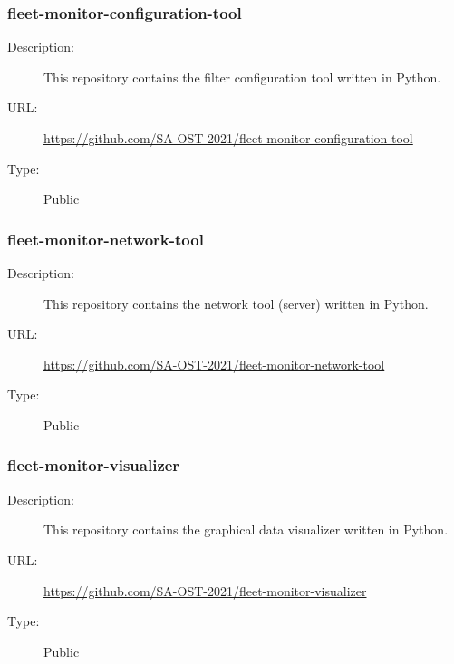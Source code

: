 \subsubsection{fleet-monitor-configuration-tool} \vspace{-0.2cm}
\begin{description}
  \item[Description:] This repository contains the filter configuration tool written in Python.\vspace{-0.25cm}
  \item[URL:] \url{https://github.com/SA-OST-2021/fleet-monitor-configuration-tool}\vspace{-0.25cm}
  \item[Type:] Public\vspace{-0.25cm}
\end{description}

\subsubsection{fleet-monitor-network-tool} \vspace{-0.2cm}
\begin{description}
  \item[Description:] This repository contains the network tool (server) written in Python.\vspace{-0.25cm}
  \item[URL:] \url{https://github.com/SA-OST-2021/fleet-monitor-network-tool}\vspace{-0.25cm}
  \item[Type:] Public\vspace{-0.25cm}
\end{description}

\subsubsection{fleet-monitor-visualizer} \vspace{-0.2cm}
\begin{description}
  \item[Description:] This repository contains the graphical data visualizer written in Python.\vspace{-0.25cm}
  \item[URL:] \url{https://github.com/SA-OST-2021/fleet-monitor-visualizer}\vspace{-0.25cm}
  \item[Type:] Public\vspace{-0.25cm}
\end{description}

